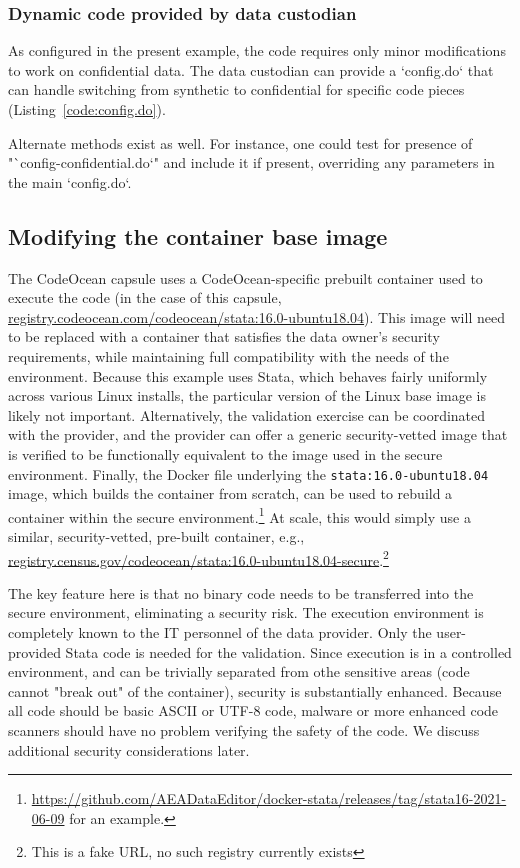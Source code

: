 \documentclass[]{hdsr}
\begin{document}
\subsubsection{Dynamic code provided by data custodian}

As configured in the present example, the code requires only minor modifications to work on confidential data. The data custodian can provide a `config.do`  that can handle switching from synthetic to confidential for specific code pieces (Listing~\ref{code:config.do}).



Alternate methods exist as well. For instance, one could test for presence of "`config-confidential.do`" and include it if present, overriding any parameters in the main `config.do`.

\subsection{Modifying the container base image}

The CodeOcean capsule uses a CodeOcean-specific prebuilt container used to execute the code (in the case of this capsule, \url{registry.codeocean.com/codeocean/stata:16.0-ubuntu18.04}). This image will need to be replaced with a container that satisfies the data owner's security requirements, while maintaining full compatibility with the needs of the environment. Because this example uses Stata, which behaves fairly uniformly across various Linux installs, the particular version of the Linux base image is likely not important.   Alternatively, the validation exercise can be coordinated with the provider, and the provider can offer a generic security-vetted image that is verified to be functionally equivalent to the image used in the secure environment. Finally, the Docker file underlying the \texttt{stata:16.0-ubuntu18.04} image, which builds the container from scratch, can be used to rebuild a container within the secure environment.\footnote{\href{github.com/AEADataEditor/docker-stata/releases/tag/stata16-2021-06-09}{https://github.com/AEADataEditor/docker-stata/releases/tag/stata16-2021-06-09} for an example.} At scale, this would simply use a similar, security-vetted, pre-built container, e.g., \url{registry.census.gov/codeocean/stata:16.0-ubuntu18.04-secure}.\footnote{This is a fake URL, no such registry currently exists}

The key feature here is that no binary code needs to be transferred into the secure environment, eliminating a security risk. The execution environment is completely known to the IT personnel of the data provider. Only the user-provided Stata code is needed for the validation. Since execution is in a controlled environment, and can be trivially separated from othe sensitive areas (code cannot "break out" of the container), security is substantially enhanced. Because all code should be basic ASCII or UTF-8 code, malware or more enhanced code scanners should have no problem verifying the safety of the code. We discuss additional security considerations later.
\end{document}

